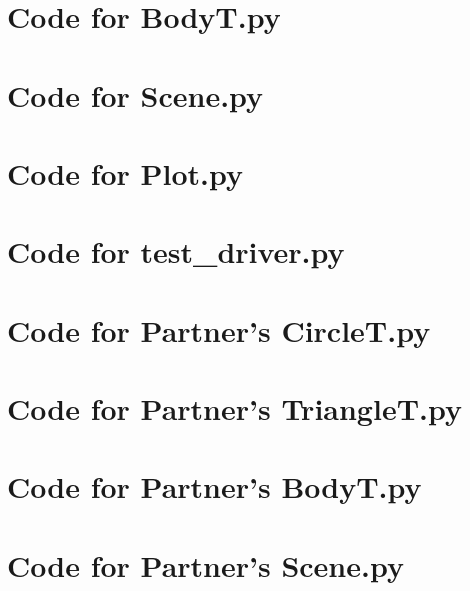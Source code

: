 \documentclass[12pt]{article}
\begin{document}
\noindent 

\newpage

\section{Code for BodyT.py}

\noindent 

\newpage

\section{Code for Scene.py}

\noindent 

\newpage

\section{Code for Plot.py}

\noindent 

\newpage

\section{Code for test\_driver.py}

\noindent 

\newpage

\section{Code for Partner's CircleT.py}

\noindent 

\newpage

\section{Code for Partner's TriangleT.py}

\noindent 

\newpage

\section{Code for Partner's BodyT.py}

\noindent 

\newpage

\section{Code for Partner's Scene.py}

\noindent 

\newpage
\end{document}
